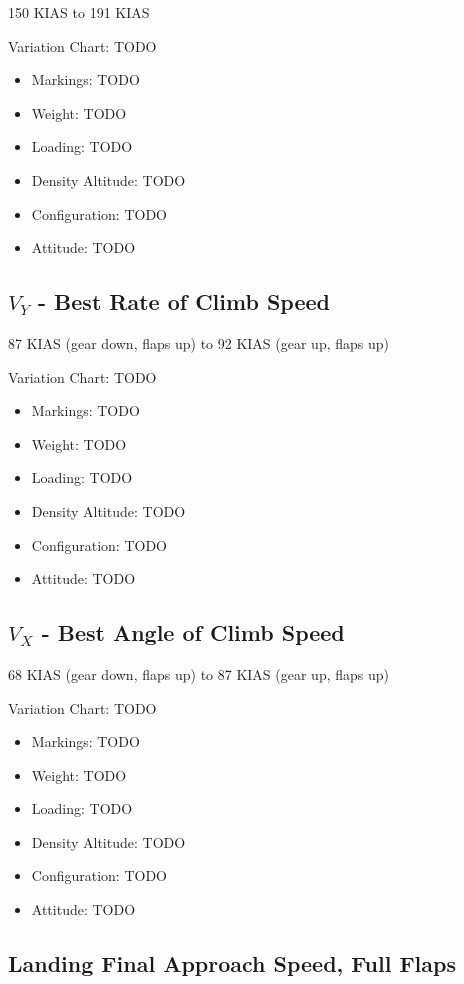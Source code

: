150 KIAS to 191 KIAS

Variation Chart: TODO
\begin{itemize}
\item Markings: TODO
\item Weight: TODO
\item Loading: TODO
\item Density Altitude: TODO
\item Configuration: TODO
\item Attitude: TODO
\end{itemize}

\subsection{$V_Y$ - Best Rate of Climb Speed}

87 KIAS (gear down, flaps up) to 92 KIAS (gear up, flaps up)

Variation Chart: TODO
\begin{itemize}
\item Markings: TODO
\item Weight: TODO
\item Loading: TODO
\item Density Altitude: TODO
\item Configuration: TODO
\item Attitude: TODO
\end{itemize}

\subsection{$V_X$ - Best Angle of Climb Speed}

68 KIAS (gear down, flaps up) to 87 KIAS (gear up, flaps up)

Variation Chart: TODO
\begin{itemize}
\item Markings: TODO
\item Weight: TODO
\item Loading: TODO
\item Density Altitude: TODO
\item Configuration: TODO
\item Attitude: TODO
\end{itemize}

\subsection{Landing Final Approach Speed, Full Flaps}

